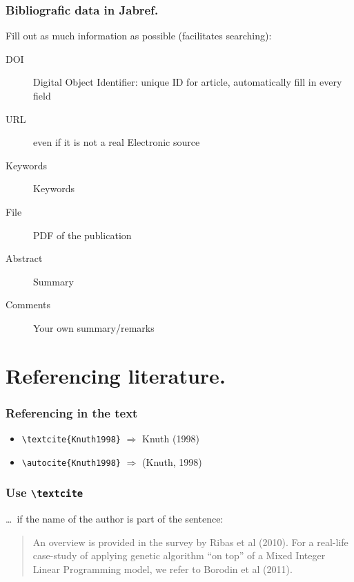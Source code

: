 \documentclass[aspectratio=169]{beamer}
\begin{document}
\begin{frame}
  \frametitle{Bibliografic data in Jabref.}

  Fill out as much information as possible (facilitates searching):

  \begin{description}
    \item[DOI] Digital Object Identifier: unique ID for article, automatically fill in every field
    \item[URL] even if it is not a real Electronic source
    \item[Keywords] Keywords
    \item[File] PDF of the publication
    \item[Abstract] Summary
    \item[Comments] Your own summary/remarks
  \end{description}

\end{frame}

\section{Referencing literature.}

\begin{frame}[fragile]
  \frametitle{Referencing in the text}

  \begin{itemize}
    \item \verb|\textcite{Knuth1998}| \(\Rightarrow\) Knuth (1998)
    \item \verb|\autocite{Knuth1998}| \(\Rightarrow\) (Knuth, 1998)
  \end{itemize}
\end{frame}

\begin{frame}
  \frametitle{Use \texttt{\textbackslash{}textcite}}

  \ldots\ if the name of the author is part of the sentence:

  \bigskip

  \begin{quotation}
    An overview is provided in the survey by Ribas et al (2010). For a real-life case-study of applying genetic algorithm ``on top'' of a Mixed Integer Linear Programming model, we refer to Borodin et al (2011).
  \end{quotation}

\end{frame}
\end{document}
